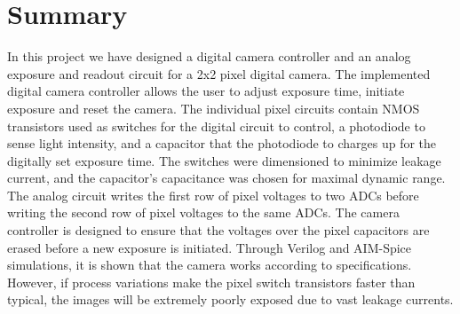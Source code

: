 \section*{Summary}

In this project we have designed a digital camera controller and an analog exposure and readout circuit for a 2x2 pixel digital camera. The implemented digital camera controller allows the user to adjust exposure time, initiate exposure and reset the camera. The individual pixel circuits contain NMOS transistors used as switches for the digital circuit to control, a photodiode to sense light intensity, and a capacitor that the photodiode to charges up for the digitally set exposure time. The switches were dimensioned to minimize leakage current, and the capacitor's capacitance was chosen for maximal dynamic range. The analog circuit writes the first row of pixel voltages to two ADCs before writing the second row of pixel voltages to the same ADCs. The camera controller is designed to ensure that the voltages over the pixel capacitors are erased before a new exposure is initiated. Through Verilog and AIM-Spice simulations, it is shown that the camera works according to specifications. However, if process variations make the pixel switch transistors faster than typical, the images will be extremely poorly exposed due to vast leakage currents.